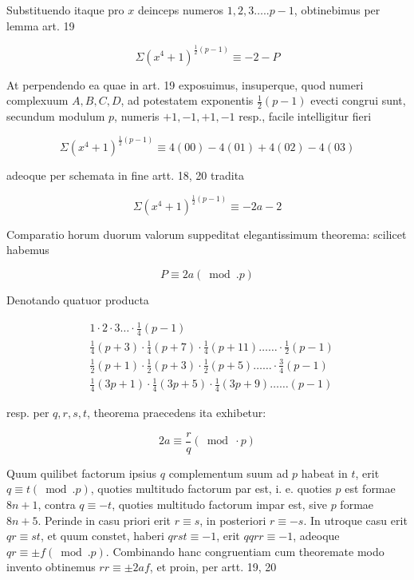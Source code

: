 \documentclass[10pt]{article}
\begin{document}
Substituendo itaque pro \(x\) deinceps numeros \(1,2,3 \ldots . . p-1\), obtinebimus per lemma art. 19

\[
\Sigma\left(x^{4}+1\right)^{\frac{1}{2}(p-1)} \equiv-2-P
\]

At perpendendo ea quae in art. 19 exposuimus, insuperque, quod numeri complexuum \(A, B, C, D\), ad potestatem exponentis \(\frac{1}{2}(p-1)\) evecti congrui sunt, secundum modulum \(p\), numeris \(+1,-1,+1,-1\) resp., facile intelligitur fieri

\[
\Sigma\left(x^{4}+1\right)^{\frac{1}{2}(p-1)} \equiv 4(00)-4(01)+4(02)-4(03)
\]

adeoque per schemata in fine artt. 18, 20 tradita

\[
\Sigma\left(x^{4}+1\right)^{\frac{1}{2}(p-1)} \equiv-2 a-2
\]

Comparatio horum duorum valorum suppeditat elegantissimum theorema: scilicet habemus

\[
P \equiv 2 a(\bmod . p)
\]

Denotando quatuor producta

\[
\begin{aligned}
& 1 \cdot 2 \cdot 3 \ldots \cdot \frac{1}{4}(p-1) \\
& \frac{1}{4}(p+3) \cdot \frac{1}{4}(p+7) \cdot \frac{1}{4}(p+11) \ldots \ldots \cdot \frac{1}{2}(p-1) \\
& \frac{1}{2}(p+1) \cdot \frac{1}{2}(p+3) \cdot \frac{1}{2}(p+5) \ldots \ldots \cdot \frac{3}{4}(p-1) \\
& \frac{1}{4}(3 p+1) \cdot \frac{1}{4}(3 p+5) \cdot \frac{1}{4}(3 p+9) \ldots \ldots(p-1)
\end{aligned}
\]

resp. per \(q, r, s, t\), theorema praecedens ita exhibetur:

\[
2 a \equiv \frac{r}{q}(\bmod \cdot p)
\]

Quum quilibet factorum ipsius \(q\) complementum suum ad \(p\) habeat in \(t\), erit \(q \equiv t(\bmod . p)\), quoties multitudo factorum par est, i. e. quoties \(p\) est formae \(8 n+1\), contra \(q \equiv-t\), quoties multitudo factorum impar est, sive \(p\) formae \(8 n+5\). Perinde in casu priori erit \(r \equiv s\), in posteriori \(r \equiv-s\). In utroque casu erit \(q r \equiv s t\), et quum constet, haberi \(q r s t \equiv-1\), erit \(q q r r \equiv-1\),
adeoque \(q r \equiv \pm f(\bmod . p)\). Combinando hanc congruentiam cum theoremate modo invento obtinemus \(r r \equiv \pm 2 a f\), et proin, per artt. 19, 20
\end{document}
